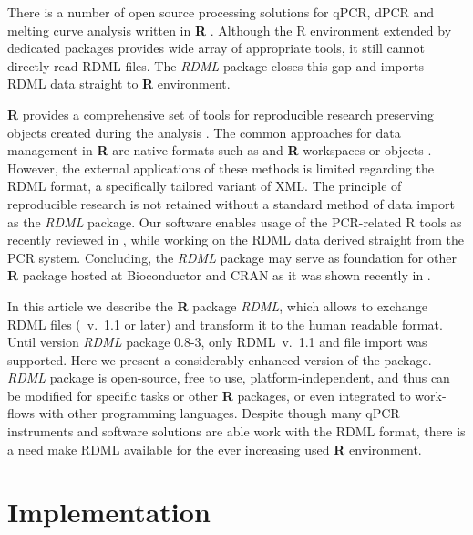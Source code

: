 \documentclass{bioinfo}
\begin{document}
There is a number of open source processing solutions for qPCR, dPCR and 
melting curve analysis written in \textbf{R} \cite{pabinger_2014, 
ritz_qpcr_2008, roediger_RJ_2013, roediger2015chippcr}. Although the R 
environment extended by dedicated packages provides wide array of appropriate 
tools, it still cannot directly read RDML files. The \textit{RDML} package 
closes this gap and imports RDML data straight to \textbf{R} environment.

	\textbf{R} provides a comprehensive set of tools for reproducible 
research preserving objects created during the analysis 
\cite{roediger2015r,roediger2015chippcr}. The common approaches for data 
management in \textbf{R} are native formats such as and \textbf{R} workspaces or 
objects \cite{roediger_rkward_2012}. However, the external applications of these 
methods is limited regarding the RDML format, a specifically tailored variant of 
XML. The principle of reproducible research is not retained without a standard 
method of data import as the \textit{RDML} package. Our software enables usage 
of the PCR-related R tools as recently reviewed in \cite{pabinger_2014}, while 
working on the RDML data derived straight from the PCR system. Concluding, the 
\textit{RDML} package may serve as foundation for other \textbf{R} package 
hosted at Bioconductor \cite{gentleman_2004} and CRAN as it was shown recently 
in \cite{roediger2015r}.

In this article we describe the \textbf{R} package \textit{RDML}, which 
allows to exchange RDML files (~v.~1.1 or later) and transform it to the human 
readable format. Until version \textit{RDML} package 0.8-3, only RDML~v.~1.1 and 
file import was supported. Here we present a considerably enhanced version of 
the package. \textit{RDML} package is open-source, free to use, 
platform-independent, and thus can be modified for specific tasks or other 
\textbf{R} packages, or even integrated to work-flows with other programming 
languages. Despite though many qPCR instruments and software solutions are able 
work with the RDML format, there is a need make RDML available for the ever 
increasing used \textbf{R} environment.

\section{Implementation}
	
\end{document}
